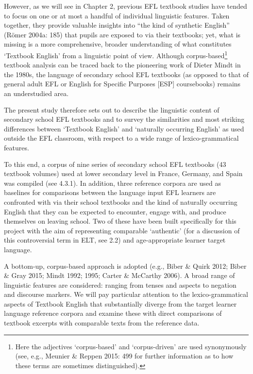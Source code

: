 \documentclass[
  letterpaper,
  DIV=11,
  numbers=noendperiod]{scrreprt}
\begin{document}
However, as we will see in Chapter 2, previous EFL textbook studies have
tended to focus on one or at most a handful of individual linguistic
features. Taken together, they provide valuable insights into ``the kind
of synthetic English'' (Römer 2004a: 185) that pupils are exposed to via
their textbooks; yet, what is missing is a more comprehensive, broader
understanding of what constitutes `Textbook English' from a linguistic
point of view. Although corpus-based\footnote{Here the adjectives
  `corpus-based' and `corpus-driven' are used synonymously (see, e.g.,
  Meunier \& Reppen 2015: 499 for further information as to how these
  terms are sometimes distinguished).} textbook analysis can be traced
back to the pioneering work of Dieter Mindt in the 1980s, the language
of secondary school EFL textbooks (as opposed to that of general adult
EFL or English for Specific Purposes {[}ESP{]} coursebooks) remains an
understudied area.

The present study therefore sets out to describe the linguistic content
of secondary school EFL textbooks and to survey the similarities and
most striking differences between `Textbook English' and `naturally
occurring English' as used outside the EFL classroom, with respect to a
wide range of lexico-grammatical features.

To this end, a corpus of nine series of secondary school EFL textbooks
(43 textbook volumes) used at lower secondary level in France, Germany,
and Spain was compiled (see 4.3.1). In addition, three reference corpora
are used as baselines for comparisons between the language input EFL
learners are confronted with via their school textbooks and the kind of
naturally occurring English that they can be expected to encounter,
engage with, and produce themselves on leaving school. Two of these have
been built specifically for this project with the aim of representing
comparable `authentic' (for a discussion of this controversial term in
ELT, see 2.2) and age-appropriate learner target language.

A bottom-up, corpus-based approach is adopted (e.g., Biber \& Quirk
2012; Biber \& Gray 2015; Mindt 1992; 1995; Carter \& McCarthy 2006). A
broad range of linguistic features are considered: ranging from tenses
and aspects to negation and discourse markers. We will pay particular
attention to the lexico-grammatical aspects of Textbook English that
substantially diverge from the target learner language reference corpora
and examine these with direct comparisons of textbook excerpts with
comparable texts from the reference data.
\end{document}
